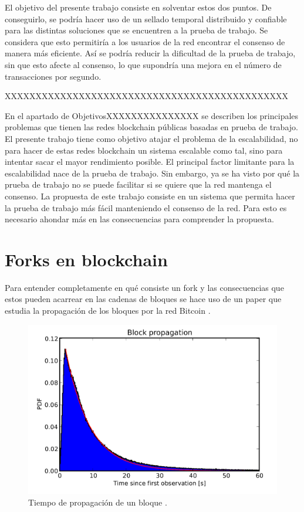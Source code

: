 El objetivo del presente trabajo consiste en solventar estos dos puntos. De conseguirlo, se podría hacer uso de un sellado temporal distribuido y confiable para las distintas soluciones que se encuentren a la prueba de trabajo. Se considera que esto permitiría a los usuarios de la red encontrar el consenso de manera más eficiente. Así se podría reducir la dificultad de la prueba de trabajo, sin que esto afecte al consenso, lo que supondría una mejora en el número de transacciones por segundo.\newline

XXXXXXXXXXXXXXXXXXXXXXXXXXXXXXXXXXXXXXXXXXXXXX


En el apartado de ObjetivosXXXXXXXXXXXXXXX se describen los principales problemas que tienen las redes blockchain públicas basadas en prueba de trabajo. El presente trabajo tiene como objetivo atajar el problema de la escalabilidad, no para hacer de estas redes blockchain un sistema escalable como tal, sino para intentar sacar el mayor rendimiento posible. El principal factor limitante para la escalabilidad nace de la prueba de trabajo. Sin embargo, ya se ha visto por qué la prueba de trabajo no se puede facilitar si se quiere que la red mantenga el consenso. La propuesta de este trabajo consiste en un sistema que permita hacer la prueba de trabajo más fácil manteniendo el consenso de la red. Para esto es necesario ahondar más en las consecuencias para comprender la propuesta.

\section{Forks en blockchain}
Para entender completamente en qué consiste un fork y las consecuencias que estos pueden acarrear en las cadenas de bloques se hace uso de un paper que estudia la propagación de los bloques por la red Bitcoin \cite{forks}. \newline

\begin{figure}
	\centering
	\includegraphics[width=1\textwidth]{imagenes/figura1.PNG}
	\caption{\label{fig1}Tiempo de propagación de un bloque \cite{forks}.}
\end{figure}

